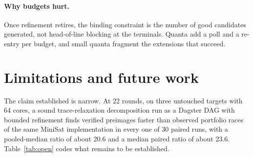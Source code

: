 \documentclass[11pt,a4paper]{article}
\begin{document}
\paragraph{Why budgets hurt.} Once refinement retires, the binding constraint is the number of
good candidates generated, not head-of-line blocking at the terminals. Quanta add a poll and a
re-entry per budget, and small quanta fragment the extensions that succeed.

\section{Limitations and future work}\label{sec:future}

The claim established is narrow. At 22 rounds, on three untouched targets with 64 cores, a sound
trace-relaxation decomposition run as a Dagster DAG with bounded refinement finds verified preimages
faster than observed portfolio races of the same MiniSat implementation in every one of 30 paired
runs, with a pooled-median ratio of about 20.6 and a median paired ratio of about 23.6. Table~\ref{tab:open} codes what remains to be established.
\end{document}
